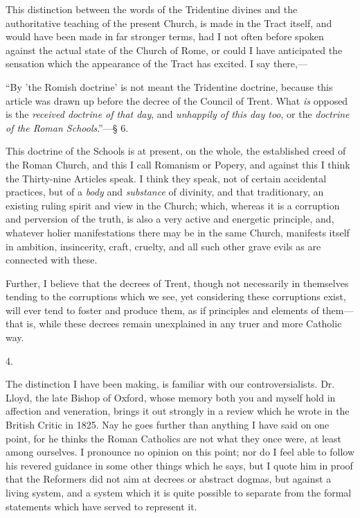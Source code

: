This distinction between the words of the
Tridentine divines and the authoritative teaching of the present
Church, is made in the Tract itself, and would have been made in far
stronger terms, had I not often before spoken against the actual state
of the Church of Rome, or could I have anticipated the sensation which
the appearance of the Tract has excited. I say there,—

``By
'the Romish doctrine' is not meant the Tridentine doctrine, because
this article was drawn up before the decree of the Council of Trent.
What \emph{is} opposed is the \emph{received doctrine of that day},
and \emph{unhappily of this day too}, or the \emph{doctrine of the Roman
Schools}.''—§ 6.

This doctrine of the Schools is at present, on
the whole, the established creed of the Roman Church, and this I call
Romanism or Popery, and against this I think the Thirty-nine Articles
speak. I think they speak, not of certain accidental practices,
but of a \emph{body} and \emph{substance} of divinity, and that
traditionary, an existing ruling spirit and view in the Church; which,
whereas it is a corruption and perversion of the truth, is also a very
active and energetic principle, and, whatever holier manifestations
there may be in the same Church, manifests itself in ambition,
insincerity, craft, cruelty, and all such other grave evils as are
connected with these.

Further, I believe that the decrees of Trent,
though not necessarily in themselves tending to the corruptions which
we see, yet considering these corruptions exist, will ever tend to
foster and produce them, as if principles and elements of them—that
is, while these decrees remain unexplained in any truer and more
Catholic way.

4.

The distinction I have been making, is familiar
with our controversialists. Dr. Lloyd, the late Bishop of Oxford,
whose memory both you and myself hold in affection and veneration,
brings it out strongly in a review which he wrote in the British
Critic in 1825. Nay he goes further than anything I have said on one
point, for he thinks the Roman Catholics are not what they once were,
at least among ourselves. I pronounce no opinion on this point; nor do
I feel able to follow his revered guidance in some other things which
he says, but I quote him in proof that the Reformers did not aim at
decrees or abstract dogmas, but against a living system, and a system
which it is quite possible to separate from the formal statements
which have served to represent it.

